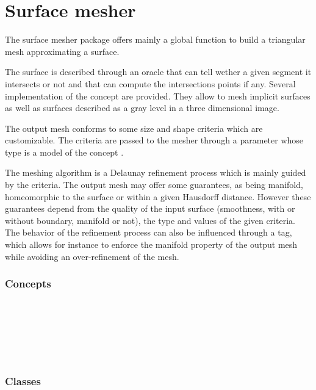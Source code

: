 \chapter{Surface mesher}


The surface mesher package offers mainly a global function
to build a triangular mesh approximating a surface.

The surface is described through an oracle that can tell wether a
given segment it intersects or not and that can compute the
intersections points if any. Several implementation of
the  concept are provided. They allow to mesh
implicit surfaces as well as  surfaces described as a gray level in a three
dimensional image.

The output mesh conforms to some size and shape criteria 
which are customizable. The criteria are passed to the mesher
through a parameter 
whose type is a model of the
concept .

The meshing algorithm is a Delaunay refinement process
which is mainly guided by the criteria. 
The output mesh may offer some guarantees, as being manifold,
homeomorphic to the surface or within a given
Hausdorff distance.  However these guarantees depend 
from the quality of the input surface (smoothness, with or without
boundary, manifold or  not),
the type and values of the given criteria. 
The behavior of the refinement process can also be influenced through
a tag, which allows for instance to enforce the manifold property
of  the output mesh  while avoiding an over-refinement of the mesh.


\subsection*{Concepts}

\\
 \\
 \\
 \\
 \\


\subsection*{Classes}
 \\
 \\
 \\
 \\
 \\

